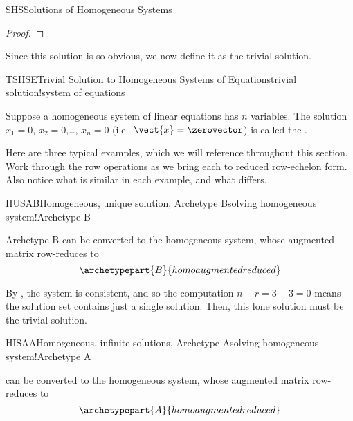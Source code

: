 \begin{subsect}{SHS}{Solutions of Homogeneous Systems}
\begin{proof}
\end{proof}
%
\begin{para}Since this solution is so obvious, we now define it as the trivial solution.\end{para}
%
\begin{definition}{TSHSE}{Trivial Solution to Homogeneous Systems of Equations}{trivial solution!system of equations}
\begin{para}Suppose a homogeneous system of linear equations has $n$ variables.  The solution $x_1=0$, $x_2=0$,\dots, $x_n=0$ (i.e.\ $\vect{x}=\zerovector$) is called the .\end{para}
\end{definition}
%
\begin{para}Here are three typical examples, which we will reference throughout this section.  Work through the row operations as we bring each to reduced row-echelon form.  Also notice what is similar in each example, and what differs.\end{para}
%
\begin{example}{HUSAB}{Homogeneous, unique solution, Archetype B}{solving homogeneous system!Archetype B}
\begin{para}Archetype B can be converted to the homogeneous system,
%
%
whose augmented matrix row-reduces to
%
\begin{equation*}
\archetypepart{B}{homoaugmentedreduced}\end{equation*}
\end{para}
%
\begin{para}By , the system is consistent, and so the computation $n-r=3-3=0$ means the solution set contains just a single solution.  Then, this lone solution must be the trivial solution.\end{para}
\end{example}
%
\begin{example}{HISAA}{Homogeneous, infinite solutions, Archetype A}{solving homogeneous system!Archetype A}
\begin{para} can be converted to the homogeneous system,
%
%
whose augmented matrix row-reduces to
%
\begin{equation*}
\archetypepart{A}{homoaugmentedreduced}\end{equation*}
\end{para}

\end{example}
\end{subsect}
